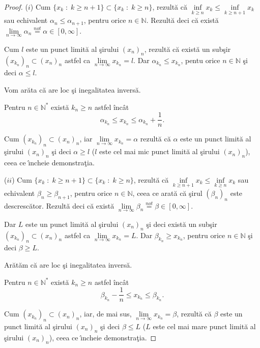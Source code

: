\documentclass[ a4paper, 12pt]{report}
\theoremstyle{definition}
\theoremstyle{remark}
\numberwithin{equation}{section}
\begin{document}
\begin{proof} ($i$) Cum $\{ x_k \; : \; k \geq n + 1\} \subset \{ x_k \; : \; k \geq n \}$, rezult\u a c\u a $\inf\limits_{k \geq n} x_k \leq \inf\limits_{k \geq n + 1} x_k$ sau echivalent $\alpha_n \leq \alpha_{n + 1}$, pentru orice $n \in \mathbb{N}$.
Rezult\u a deci c\u a exist\u a $\lim\limits_{n \rightarrow \infty} \alpha_n \stackrel{not}{=} \alpha \in [0,\infty]$.

Cum $l$ este un punct limit\u a al \c sirului $(x_n)_n$, rezult\u a c\u a exist\u a un sub\c sir $(x_{k_n})_n \subset (x_n)_n$ astfel ca $\lim\limits_{n \to \infty} x_{k_n} = l$.
Dar $\alpha_{k_n} \leq x_{k_n}$, pentu orice $n \in \mathbb{N}$ \c si deci $\alpha \leq l$.

Vom ar\u ata c\u a are loc \c si inegalitatea invers\u a.

Pentru $n \in \mathbb{N}^\ast$ exist\u a $k_n \geq n $ astfel \^inc\^at
$$\alpha_{k_n} \leq x_{k_n} \leq \alpha_{k_n} + \frac{1}{n}.$$

Cum $(x_{k_n})_n \subset (x_n)_n$, iar $\lim\limits_{n \to \infty} x_{k_n} = \alpha$ rezult\u a c\u a $\alpha$ este un punct limit\u a al \c sirului $(x_n)_n$ \c si deci $\alpha \geq l$ ($l$ este cel mai mic punct limit\u a al \c sirului $(x_n)_n$), ceea ce \^\i ncheie demonstra\c tia.

\smallskip

($ii$) Cum $\{ x_k \; : \; k \geq n + 1\} \subset \{ x_k \; : \; k \geq n \}$, rezult\u a c\u a $\inf\limits_{k \geq n + 1} x_k \leq \inf\limits_{k \geq n} x_k$ sau echivalent $\beta_n \geq \beta_{n + 1}$, pentru orice $n \in \mathbb{N}$, ceea ce arat\u a c\u a \c sirul $(\beta_n)_n$ este descresc\u ator.
Rezult\u a deci c\u a exist\u a $\lim\limits_{n \rightarrow \infty} \beta_n \stackrel{not}{=} \beta \in [0,\infty]$.

Dar $L$ este un punct limit\u a al \c sirului $(x_n)_n$ \c si deci exist\u a un sub\c sir $(x_{k_n})_n \subset (x_n)_n$ astfel ca $\lim\limits_{n \to \infty} x_{k_n} = L$.
Dar $\beta_{k_n} \geq x_{k_n}$, pentru orice $n \in \mathbb{N}$ \c si deci $\beta \geq L$.

Ar\u at\u am c\u a are loc \c si inegalitatea invers\u a.

Pentru $n \in \mathbb{N}^\ast$ exist\u a $k_n \geq n $ astfel \^inc\^at
$$\beta_{k_n} - \frac{1}{n} \leq x_{k_n} \leq \beta_{k_n}.$$

Cum $(x_{k_n})_n \subset (x_n)_n$, iar, de mai sus, $\lim\limits_{n \to \infty} x_{k_n} = \beta$, rezult\u a c\u a $\beta$ este un punct limit\u a al \c sirului $(x_n)_n$ \c si deci $\beta \leq L$ ($L$ este cel mai mare punct limit\u a al \c sirului $(x_n)_n$), ceea ce \^\i ncheie demonstra\c tia.
\end{proof}
\end{document}
